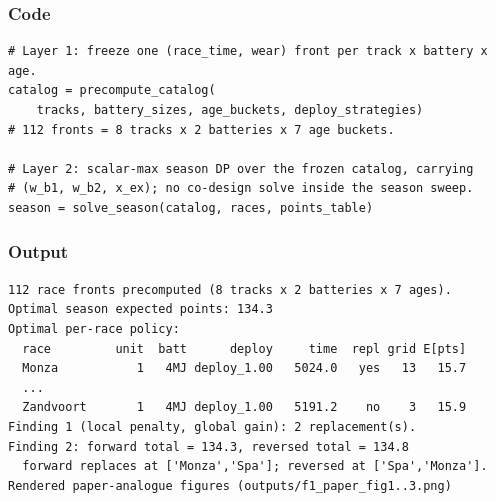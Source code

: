 \documentclass[11pt,a4paper]{article}
\begin{document}
\subsubsection*{Code}
\begin{lstlisting}
# Layer 1: freeze one (race_time, wear) front per track x battery x age.
catalog = precompute_catalog(
    tracks, battery_sizes, age_buckets, deploy_strategies)
# 112 fronts = 8 tracks x 2 batteries x 7 age buckets.

# Layer 2: scalar-max season DP over the frozen catalog, carrying
# (w_b1, w_b2, x_ex); no co-design solve inside the season sweep.
season = solve_season(catalog, races, points_table)
\end{lstlisting}

\subsubsection*{Output}
\begin{lstlisting}[language={},numbers=none,keywordstyle={}]
  112 race fronts precomputed (8 tracks x 2 batteries x 7 ages).
Optimal season expected points: 134.3
Optimal per-race policy:
  race         unit  batt      deploy     time  repl grid E[pts]
  Monza           1   4MJ deploy_1.00   5024.0   yes   13   15.7
  ...
  Zandvoort       1   4MJ deploy_1.00   5191.2    no    3   15.9
Finding 1 (local penalty, global gain): 2 replacement(s).
Finding 2: forward total = 134.3, reversed total = 134.8
  forward replaces at ['Monza','Spa']; reversed at ['Spa','Monza'].
Rendered paper-analogue figures (outputs/f1_paper_fig1..3.png)
\end{lstlisting}
\end{document}
